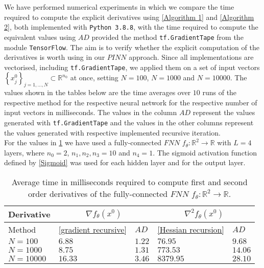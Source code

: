 We have performed numerical experiments in which we compare the time required to compute the explicit derivatives using \cref{Algorithm 1} and \cref{Algorithm 2}, both implemented with \lstinline!Python 3.8.8!, with the time required to compute the equivalent values using $AD$ provided the method \lstinline!tf.GradientTape! from the module \lstinline!TensorFlow!. The aim is to verify whether the explicit computation of the derivatives is worth using in our $PINN$ approach. Since all implementations are vectorised, including \lstinline!tf.GradientTape!, we applied them on a set of input vectors $\left\{ x^0_j \right\}_{j=1,\ldots,N} \subset \mathbb{R}^{n_0}$ at once, setting $N=100$, $N=1000$ and $N=10000$. The values shown in the tables below are the time averages over $10$ runs of the respective method for the respective neural network for the respective number of input vectors in milliseconds. The values in the column $AD$ represent the values generated with \lstinline!tf.GradientTape! and the values in the other columns represent the values generated with respective implemented recursive iteration. \\   
For the values in \cref{tab:advs ecplicit: fnn} we have used a fully-connected $FNN$ $f_{\theta} \colon \mathbb{R}^2 \to \mathbb{R}$ with $L = 4$ layers, where $n_0 = 2$, $n_1, n_2, n_3 = 10$ and $n_4 = 1$. The sigmoid activation function defined by \cref{Sigmoid} was used for each hidden layer and for the output layer. 
\begin{table}[H]
    \resizebox{\textwidth}{!}
    {
        \begin{tabular}{l l l l l }
            \toprule
            Derivative & \multicolumn{2}{c}{$\nabla f_{\theta} \left( x^0 \right)$}& \multicolumn{2}{c}{$\nabla^2 f_{\theta} \left(x^0\right)$} \\ 
            \midrule
            Method & \cref{gradient recursive} & $AD$ & \cref{Hessian recursion} & $AD$ \\ 
            \midrule
            $N = 100$ & $6.88$ & $1.22$ & $76.95$ & $9.68$ \\ 
            \midrule
            $N = 1000$ & $8.75$ & $1.31$ & $773.53$ & $14.06$ \\ 
            \midrule
            $N = 10000$ & $16.33$ & $3.46$ & $8379.95$ & $28.10$ \\ 
            \bottomrule
        \end{tabular}
    }
    \caption{Average time in milliseconds required to compute first and second order derivatives of the fully-connected $FNN$ $f_{\theta} \colon \mathbb{R}^2 \to \mathbb{R}$.}
    \label{tab:advs ecplicit: fnn}
\end{table}
